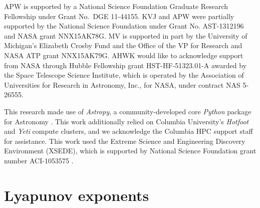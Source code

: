 \documentclass{mn2e}
\newcommand{\project}[1]{\textsl{#1}}
\begin{document}
APW is supported by a National Science Foundation Graduate Research Fellowship under Grant No.\ DGE 11-44155. KVJ and APW were partially supported by the National Science Foundation under Grant No. AST-1312196 and NASA grant NNX15AK78G. MV is supported in part by the University of Michigan's Elizabeth Crosby Fund and the Office of the VP for Research and NASA ATP grant NNX15AK79G. AHWK would like to acknowledge support from NASA through Hubble Fellowship grant HST-HF-51323.01-A awarded by the Space Telescope Science Institute, which is operated by the Association of Universities for Research in Astronomy, Inc., for NASA, under contract NAS 5-26555.

This research made use of \project{Astropy}, a community-developed core \project{Python} package for Astronomy \citep{astropy13}. This work additionally relied on Columbia University's \emph{Hotfoot} and \emph{Yeti} compute clusters, and we acknowledge the Columbia HPC support staff for assistance. This work used the Extreme Science and Engineering Discovery Environment (XSEDE), which is supported by National Science Foundation grant number ACI-1053575 \citep{xsede}.




\appendix
\section{Lyapunov exponents} \label{sec:lyapapdx}
\end{document}
